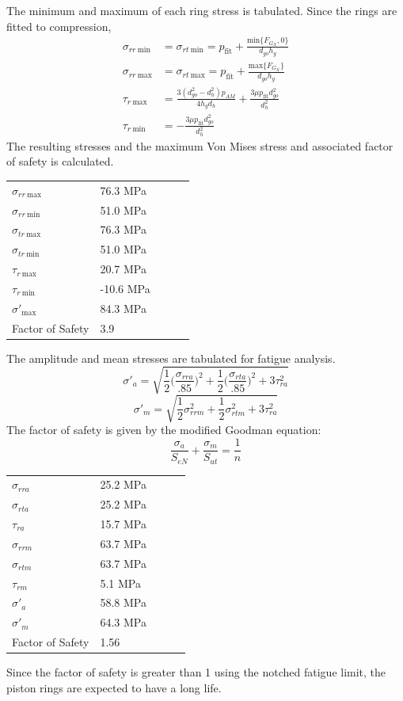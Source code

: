 \documentclass[10pt,a4paper]{article}
\begin{document}
	The minimum and maximum of each ring stress is tabulated. Since the rings are fitted to compression, 
	\begin{align*}
		\sigma_{r r\ \text{min}} &= \sigma_{rt\ \text{min}} = p_{\text{fit}} + \frac{\text{min} \{ F_{G_X}, 0 \}}{d_{go} h_g}\\
		\sigma_{rr\ \text{max}} &= \sigma_{rt\ \text{max}} = p_{\text{fit}} + \frac{\text{max} \{ F_{G_X}\}}{d_{go} h_g}\\
		\tau_{r\ \text{max}} &= \frac{3  (d_{go}^2-d_{h}^2) p_{AM}}{4 h_g d_h} + \frac{3 \mu p_{\text{fit}} d_{go}^2}{d_h^2}\\
		\tau_{r\  \text{min}} &= -\frac{3 \mu p_{\text{fit}} d_{go}^2}{d_h^2}
	\end{align*}
	The resulting stresses and the maximum Von Mises stress and associated factor of safety is calculated.
\begin{table}[H]
\begin{tabular}{lllll}
 $\sigma_{r r\ \text{max}}$ & 76.3 MPa \\
 $\sigma_{r r\ \text{min}}$& 51.0 MPa \\
 $\sigma_{t r\ \text{max}}$ & 76.3 MPa \\
 $\sigma_{t r\ \text{min}}$& 51.0 MPa \\
 $\tau_{r\ \text{max}}$ &  20.7 MPa \\
 $\tau_{r\  \text{min}}$&  -10.6 MPa \\
 $\sigma'_{\text{max}}$ & 84.3 MPa\\
 Factor of Safety & 3.9
\end{tabular}
\end{table}
The amplitude and mean stresses are tabulated for fatigue analysis. 
$$\sigma'_a = \sqrt{\frac{1}{2} \big( \frac{\sigma_{rr a}}{.85} \big)^2 + \frac{1}{2} \big( \frac{\sigma_{rt a}}{.85} \big)^2 + 3 \tau_{r a}^2}$$
$$\sigma'_m = \sqrt{\frac{1}{2} \sigma_{rr m}^2 + \frac{1}{2} \sigma_{rt m}^2 + 3 \tau_{r a}^2}$$
The factor of safety is given by the modified Goodman equation:
$$\frac{\sigma_a}{S_{eN}} + \frac{\sigma_m}{S_{ut}} = \frac{1}{n} $$

\begin{table}[H]
\begin{tabular}{lllll}
 $\sigma_{r r a}$ & 25.2 MPa \\
 $\sigma_{r t a}$& 25.2 MPa \\
 $\tau_{r a}$&  15.7 MPa \\
 $\sigma_{r r m}$ & 63.7 MPa \\
 $\sigma_{r t m}$& 63.7 MPa \\
 $\tau_{r m}$&  5.1 MPa \\
 $\sigma'_{a}$ & 58.8 MPa\\
 $\sigma'_{m}$ & 64.3 MPa\\
 Factor of Safety & 1.56
\end{tabular}
\end{table}
Since the factor of safety is greater than 1 using the notched fatigue limit, the piston rings are expected to have a long life.
\end{document}

